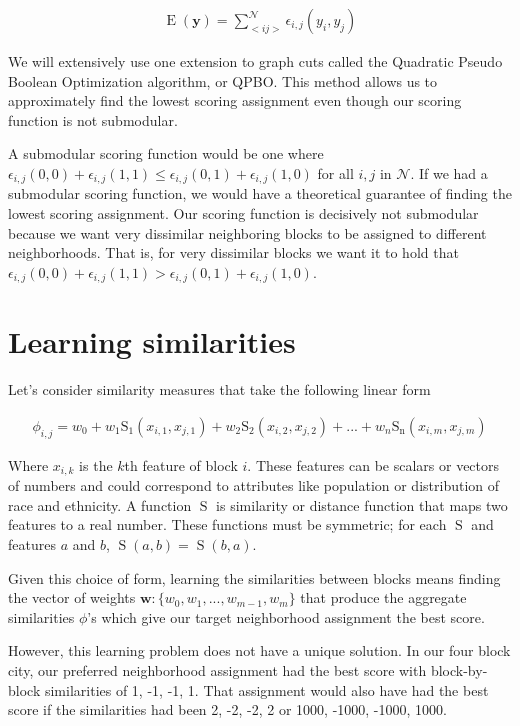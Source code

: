 \begin{align}
\operatorname{E}(\mathbf{y}) = \sum_{<i j>}^{\mathcal{N}}\epsilon_{i,j}(y_i,y_j)
\end{align}

We will extensively use one extension to graph cuts called the
Quadratic Pseudo Boolean Optimization algorithm, or QPBO. This method
allows us to approximately find the lowest scoring assignment even
though our scoring function is not submodular. 

A submodular scoring function would be one where $\epsilon_{i,j}(0,0)
+ \epsilon_{i,j}(1,1) \leq \epsilon_{i,j}(0,1) + \epsilon_{i,j}(1,0)$
for all $i,j$ in $\mathcal{N}$. If we had a submodular scoring
function, we would have a theoretical guarantee of finding the lowest
scoring assignment. Our scoring function is decisively not submodular
because we want very dissimilar neighboring blocks to be assigned to
different neighborhoods. That is, for very dissimilar blocks we want
it to hold that $\epsilon_{i,j}(0,0) + \epsilon_{i,j}(1,1)
\boldsymbol{>} \epsilon_{i,j}(0,1) + \epsilon_{i,j}(1,0)$.


\section*{Learning similarities}
Let's consider similarity measures that take the following linear form

\begin{align}
\phi_{i,j} = w_0 + w_1\operatorname{S_1}(x_{i,1}, x_{j,1}) +
w_2\operatorname{S_2}(x_{i,2}, x_{j,2}) + ... +
w_n\operatorname{S_n}(x_{i,m},x_{j,m})
\end{align} 

Where $x_{i,k}$ is the $k$th feature of block $i$. These features can
be scalars or vectors of numbers and could correspond to attributes
like population or distribution of race and ethnicity. A function
$\operatorname{S}$ is similarity or distance function that maps two
features to a real number. These functions must be symmetric; for each
$\operatorname{S}$ and features $a$ and $b$, $\operatorname{S}(a,b) =
\operatorname{S}(b,a)$.

Given this choice of form, learning the similarities between blocks
means finding the vector of weights $\mathbf{w}: \{w_0, w_1, ...,
w_{m-1}, w_m\}$ that produce the aggregate similarities $\phi$'s which
give our target neighborhood assignment the best score. 

However, this learning problem does not have a unique solution. In our
four block city, our preferred neighborhood assignment had the best
score with block-by-block similarities of 1, -1, -1, 1. That
assignment would also have had the best score if the similarities had
been 2, -2, -2, 2 or 1000, -1000, -1000,
1000. 

